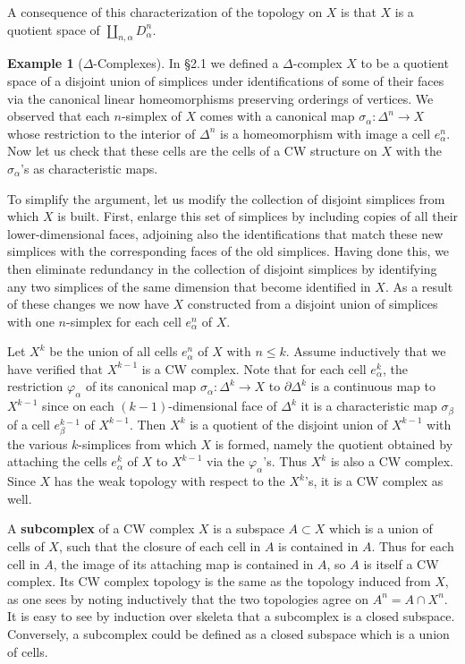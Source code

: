 \documentclass{article}
\theoremstyle{definition}
\newtheorem{example}[theorem]{Example}
\begin{document}
A consequence of this characterization of the topology on $X$ is that $X$ is a quotient space of $\coprod_{n,\alpha} D_\alpha^n$.

\begin{example}[$\Delta$-Complexes]
In \S2.1 we defined a $\Delta$-complex $X$ to be a quotient space of a disjoint union of simplices under identifications of some of their faces via the canonical linear homeomorphisms preserving orderings of vertices. We observed that each $n$-simplex of $X$ comes with a canonical map $\sigma_\alpha: \Delta^n \to X$ whose restriction to the interior of $\Delta^n$ is a homeomorphism with image a cell $e_\alpha^n$. Now let us check that these cells are the cells of a CW structure on $X$ with the $\sigma_\alpha$'s as characteristic maps.

To simplify the argument, let us modify the collection of disjoint simplices from which $X$ is built. First, enlarge this set of simplices by including copies of all their lower-dimensional faces, adjoining also the identifications that match these new simplices with the corresponding faces of the old simplices. Having done this, we then eliminate redundancy in the collection of disjoint simplices by identifying any two simplices of the same dimension that become identified in $X$. As a result of these changes we now have $X$ constructed from a disjoint union of simplices with one $n$-simplex for each cell $e_{\alpha}^{n}$ of $X$.

Let $X^k$ be the union of all cells $e_{\alpha}^{n}$ of $X$ with $n \leq k$. Assume inductively that we have verified that $X^{k-1}$ is a CW complex. Note that for each cell $e_{\alpha}^{k}$, the restriction $\varphi_{\alpha}$ of its canonical map $\sigma_{\alpha}: \Delta^k \rightarrow X$ to $\partial \Delta^k$ is a continuous map to $X^{k-1}$ since on each $(k-1)$-dimensional face of $\Delta^k$ it is a characteristic map $\sigma_{\beta}$ of a cell $e_{\beta}^{k-1}$ of $X^{k-1}$. Then $X^k$ is a quotient of the disjoint union of $X^{k-1}$ with the various $k$-simplices from which $X$ is formed, namely the quotient obtained by attaching the cells $e_{\alpha}^{k}$ of $X$ to $X^{k-1}$ via the $\varphi_{\alpha}$'s. Thus $X^k$ is also a CW complex. Since $X$ has the weak topology with respect to the $X^{k}$'s, it is a CW complex as well.
\end{example}

A \textbf{subcomplex} of a CW complex $X$ is a subspace $A \subset X$ which is a union of cells of $X$, such that the closure of each cell in $A$ is contained in $A$. Thus for each cell in $A$, the image of its attaching map is contained in $A$, so $A$ is itself a CW complex. Its CW complex topology is the same as the topology induced from $X$, as one sees by noting inductively that the two topologies agree on $A^n = A \cap X^n$. It is easy to see by induction over skeleta that a subcomplex is a closed subspace. Conversely, a subcomplex could be defined as a closed subspace which is a union of cells.
\end{document}
